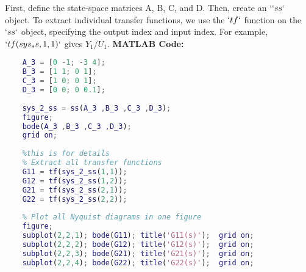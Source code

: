 \documentclass[a4paper,12pt]{article}
\begin{document}
	First, define the state-space matrices A, B, C, and D. Then, create an `$`ss`$ object. To extract individual transfer functions, we use the $`tf`$ function on the $`ss`$ object, specifying the output index and input index. For example,$ `tf(sys_ss, 1, 1)`$ gives $Y_1/U_1$.
	\newpage
	\textbf{MATLAB Code:}
	\begin{lstlisting}[language=Matlab, caption=MATLAB Code for Problem 3]
		% Define state-space matrices
	A_3 = [0 -1; -3 4];
	B_3 = [1 1; 0 1];
	C_3 = [1 0; 0 1];
	D_3 = [0 0; 0 0.1];
	
	sys_2_ss = ss(A_3 ,B_3 ,C_3 ,D_3);
	figure;
	bode(A_3 ,B_3 ,C_3 ,D_3);
	grid on;
	
	%this is for details
	% Extract all transfer functions
	G11 = tf(sys_2_ss(1,1));
	G12 = tf(sys_2_ss(1,2));
	G21 = tf(sys_2_ss(2,1));
	G22 = tf(sys_2_ss(2,2));
	
	% Plot all Nyquist diagrams in one figure
	figure;
	subplot(2,2,1); bode(G11); title('G11(s)');  grid on;
	subplot(2,2,2); bode(G12); title('G12(s)');  grid on;
	subplot(2,2,3); bode(G21); title('G21(s)');  grid on;
	subplot(2,2,4); bode(G22); title('G22(s)');  grid on;
	
	
	
	\end{lstlisting}
	
\end{document}
